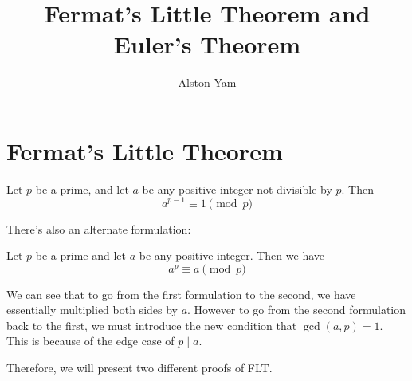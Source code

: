 \documentclass{article}
\title{Fermat's Little Theorem and Euler's Theorem}
\author{Alston Yam}
\date{}
\theoremstyle{mytheoremstyle}
\theoremstyle{mytheoremstyle}
\theoremstyle{myproblemstyle}
\begin{document}
    \maketitle

    \section{Fermat's Little Theorem}
    
    \begin{theorem}
        Let $p$ be a prime, and let $a$ be any positive integer not divisible by $p$. Then \[a^{p-1} \equiv 1 \pmod{p}\]    
    \end{theorem}

    There's also an alternate formulation: 

    \begin{theorem}
        Let $p$ be a prime and let $a$ be any positive integer. Then we have
        \[a^p \equiv a \pmod{p}\]
    \end{theorem}

    We can see that to go from the first formulation to the second, we have essentially multiplied both sides by $a$. However to go from the second formulation back to the first, we must introduce the new condition that $\gcd(a, p) = 1$. This is because of the edge case of $p \mid a$.

    \begin{center}
    \end{center}

    Therefore, we will present two different proofs of FLT.
\end{document}
